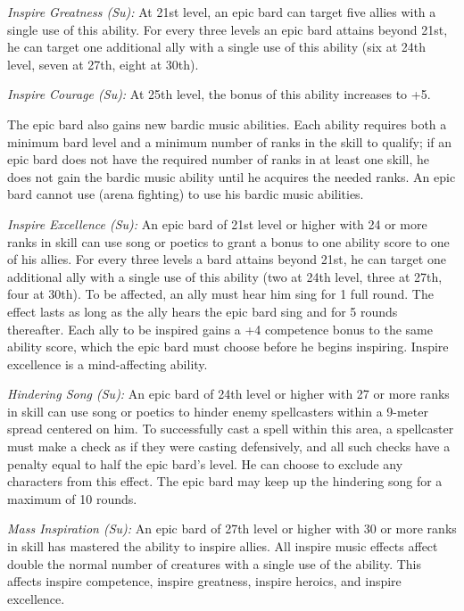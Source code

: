 \textit{Inspire Greatness (Su):} At 21st level, an epic bard can target five allies with a single use of this ability. For every three levels an epic bard attains beyond 21st, he can target one additional ally with a single use of this ability (six at 24th level, seven at 27th, eight at 30th).

\textit{Inspire Courage (Su):} At 25th level, the bonus of this ability increases to +5.

The epic bard also gains new bardic music abilities. Each ability requires both a minimum bard level and a minimum number of ranks in the  skill to qualify; if an epic bard does not have the required number of ranks in at least one  skill, he does not gain the bardic music ability until he acquires the needed ranks. An epic bard cannot use  (arena fighting) to use his bardic music abilities.

\textit{Inspire Excellence (Su):} An epic bard of 21st level or higher with 24 or more ranks in  skill can use song or poetics to grant a bonus to one ability score to one of his allies. For every three levels a bard attains beyond 21st, he can target one additional ally with a single use of this ability (two at 24th level, three at 27th, four at 30th). To be affected, an ally must hear him sing for 1 full round. The effect lasts as long as the ally hears the epic bard sing and for 5 rounds thereafter. Each ally to be inspired gains a +4 competence bonus to the same ability score, which the epic bard must choose before he begins inspiring. Inspire excellence is a mind-affecting ability.

\textit{Hindering Song (Su):} An epic bard of 24th level or higher with 27 or more ranks in  skill can use song or poetics to hinder enemy spellcasters within a 9-meter spread centered on him. To successfully cast a spell within this area, a spellcaster must make a  check as if they were casting defensively, and all such checks have a penalty equal to half the epic bard's level. He can choose to exclude any characters from this effect. The epic bard may keep up the hindering song for a maximum of 10 rounds.

\textit{Mass Inspiration (Su):} An epic bard of 27th level or higher with 30 or more ranks in  skill has mastered the ability to inspire allies. All inspire music effects affect double the normal number of creatures with a single use of the ability. This affects inspire competence, inspire greatness, inspire heroics, and inspire excellence.

